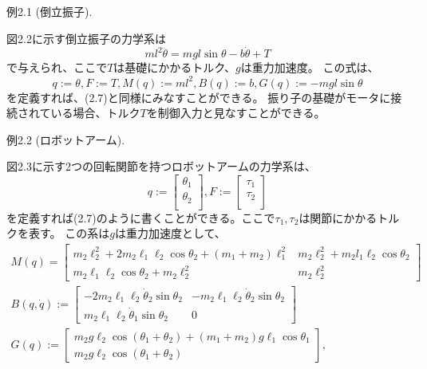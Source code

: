 \documentclass{jsarticle}
\begin{document}
例2.1 (倒立振子). \par
図2.2に示す倒立振子の力学系は
\begin{equation}
  ml^2\ddot{\theta} = mgl\sin{\theta}-b\dot{\theta}+T
\end{equation}
で与えられ、ここで$T$は基礎にかかるトルク、$g$は重力加速度。
この式は、
\begin{equation}
  q := \theta , F := T , M(q) := ml^2 , B(q) := b , G(q) := -mgl\sin{\theta}
\end{equation}
を定義すれば、(2.7)と同様にみなすことができる。
振り子の基礎がモータに接続されている場合、トルク$T$を制御入力と見なすことができる。

\newpage

例2.2 (ロボットアーム). \par
図2.3に示す2つの回転関節を持つロボットアームの力学系は、
\begin{equation}
  q := 
  \begin{bmatrix}
    \theta_1 \\
    \theta_2 \\
  \end{bmatrix}
  , F := 
  \begin{bmatrix}
    \tau_1 \\
    \tau_2 \\
  \end{bmatrix}
\end{equation}
を定義すれば(2.7)のように書くことができる。ここで$\tau_1,\tau_2$は関節にかかるトルクを表す。
この系は$g$は重力加速度として、
\begin{equation}
  \begin{array}{l}
  M(q)=\left[\begin{array}{cc}
  m_{2} \ell_{2}^{2}+2 m_{2} \ell_{1} \ell_{2} \cos \theta_{2}+\left(m_{1}+m_{2}\right) \ell_{1}^{2} & m_{2} \ell_{2}^{2}+m_{2} l_{1} \ell_{2} \cos \theta_{2} \\
  m_{2} \ell_{1} \ell_{2} \cos \theta_{2}+m_{2} \ell_{2}^{2} & m_{2} \ell_{2}^{2}
  \end{array}\right] \\
  B(q, \dot{q}):=\left[\begin{array}{cc}
  -2 m_{2} \ell_{1} \ell_{2} \dot{\theta}_{2} \sin \theta_{2} & -m_{2} \ell_{1} \ell_{2} \dot{\theta}_{2} \sin \theta_{2} \\
  m_{2} \ell_{1} \ell_{2} \dot{\theta}_{1} \sin \theta_{2} & 0
  \end{array}\right] \\
  G(q):=\left[\begin{array}{c}
  m_{2} g \ell_{2} \cos \left(\theta_{1}+\theta_{2}\right)+\left(m_{1}+m_{2}\right) g \ell_{1} \cos \theta_{1} \\
  m_{2} g \ell_{2} \cos \left(\theta_{1}+\theta_{2}\right)
  \end{array}\right],
  \end{array}
\end{equation}
\end{document}
